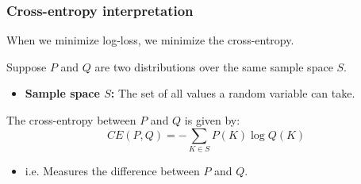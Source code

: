     \subsubsection{Cross-entropy interpretation}
    \begin{definition}
        When we minimize log-loss, we minimize the cross-entropy.
    \end{definition}

    \begin{definition}
        Suppose \( P \) and \( Q \) are two distributions over the same sample space \( S \).
        \begin{itemize}
            \item \textbf{Sample space \( S \):} The set of all values a random variable can take.
        \end{itemize}
        \vspace{1em}

        The cross-entropy between \( P \) and \( Q \) is given by:
        \[
        CE(P, Q) = -\sum_{K \in S} P(K) \log Q(K)
        \]
        \begin{itemize}
            \item i.e. Measures the difference between $P$ and $Q$.
        \end{itemize}
    \end{definition}

